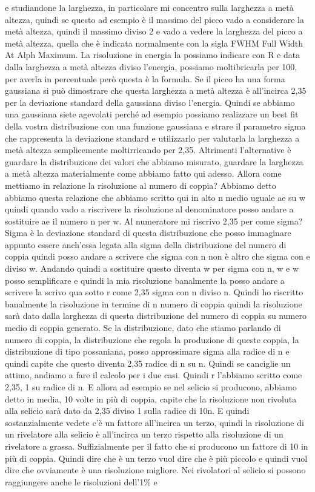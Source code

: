 e studiandone la larghezza, in particolare mi concentro sulla larghezza a metà altezza, quindi se questo ad esempio è il massimo del picco vado a considerare la metà altezza, quindi il massimo diviso 2 e vado a vedere la larghezza del picco a metà altezza, quella che è indicata normalmente con la sigla FWHM Full Width At Alph Maximum. La risoluzione in energia la possiamo indicare con R e data dalla larghezza a metà altezza diviso l'energia, possiamo moltibricarla per 100, per averla in percentuale però questa è la formula. Se il picco ha una forma gaussiana si può dimostrare che questa larghezza a metà altezza è all'incirca 2,35 per la deviazione standard della gaussiana diviso l'energia. Quindi se abbiamo una gaussiana siete agevolati perché ad esempio possiamo realizzare un best fit della vostra distribuzione con una funzione gaussiana e strare il parametro sigma che rappresenta la deviazione standard e utilizzarlo per valutarla la larghezza a metà altezza semplicemente moltirricando per 2,35. Altrimenti l'alternative è guardare la distribuzione dei valori che abbiamo misurato, guardare la larghezza a metà altezza materialmente come abbiamo fatto qui adesso. Allora come mettiamo in relazione la risoluzione al numero di coppia? Abbiamo detto abbiamo questa relazione che abbiamo scritto qui in alto n medio uguale ae su w quindi quando vado a riscrivere la risoluzione al denominatore posso andare a sostituire ae il numero n per w. Al numeratore mi riscrivo 2,35 per come sigma? Sigma è la deviazione standard di questa distribuzione che posso immaginare appunto essere anch'essa legata alla sigma della distribuzione del numero di coppia quindi posso andare a scrivere che sigma con n non è altro che sigma con e diviso w. Andando quindi a sostituire questo diventa w per sigma con n, w e w posso semplificare e quindi la mia risoluzione banalmente la posso andare a scrivere la scrivo qua sotto r come 2,35 sigma con n diviso n. Quindi ho riscritto banalmente la risoluzione in termine di n numero di coppia quindi la risoluzione sarà dato dalla larghezza di questa distribuzione del numero di coppia su numero medio di coppia generato. Se la distribuzione, dato che stiamo parlando di numero di coppia, la distribuzione che regola la produzione di queste coppia, la distribuzione di tipo possaniana, posso approssimare sigma alla radice di n e quindi capite che questo diventa 2,35 radice di n su n. Quindi se canciglie un attimo, andiamo a fare il calcolo per i due casi. Quindi r l'abbiamo scritto come 2,35, 1 su radice di n. E allora ad esempio se nel selicio si producono, abbiamo detto in media, 10 volte in più di coppia, capite che la risoluzione non rivoluta alla selicio sarà dato da 2,35 diviso 1 sulla radice di 10n. E quindi sostanzialmente vedete c'è un fattore all'incirca un terzo, quindi la risoluzione di un rivelatore alla selicio è all'incirca un terzo rispetto alla risoluzione di un rivelatore a grassa. Suffizialmente per il fatto che si producono un fattore di 10 in più di coppia. Quindi dire che è un terzo vuol dire che è più piccolo e quindi vuol dire che ovviamente è una risoluzione migliore. Nei rivolatori al selicio si possono raggiungere anche le risoluzioni dell'1\% e 

